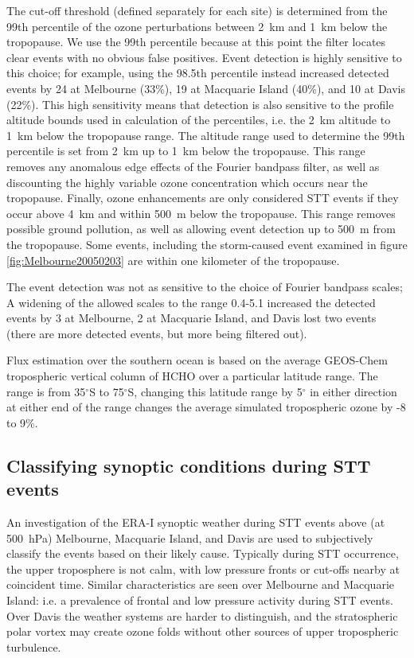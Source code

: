 \documentclass{article}
\begin{document}
    The cut-off threshold (defined separately for each site) is determined from the 99th percentile of the ozone perturbations between 2~km and 1~km below the tropopause.
    We use the 99th percentile because at this point the filter locates clear events with no obvious false positives.
    Event detection is highly sensitive to this choice; for example, using the 98.5th percentile instead increased detected events by 24 at Melbourne (33\%), 19 at Macquarie Island (40\%), and 10 at Davis (22\%).
    This high sensitivity means that detection is also sensitive to the profile altitude bounds used in calculation of the percentiles, i.e. the 2~km altitude to 1~km below the tropopause range.
    The altitude range used to determine the 99th percentile is set from 2~km up to 1~km below the tropopause.
    This range removes any anomalous edge effects of the Fourier bandpass filter, as well as discounting the highly variable ozone concentration which occurs near the tropopause.
    Finally, ozone enhancements are only considered STT events if they occur above 4~km and within 500~m below the tropopause.
    This range removes possible ground pollution, as well as allowing event detection up to 500~m from the tropopause.
    Some events, including the storm-caused event examined in figure \ref{fig:Melbourne20050203} are within one kilometer of the tropopause. 
    
    The event detection was not as sensitive to the choice of Fourier bandpass scales; A widening of the allowed scales to the range 0.4-5.1 increased the detected events by 3 at Melbourne, 2 at Macquarie Island, and Davis lost two events (there are more detected events, but more being filtered out).
    
    Flux estimation over the southern ocean is based on the average GEOS-Chem tropospheric vertical column of HCHO over a particular latitude range.
    The range is from 35$^{\circ}$S to 75$^{\circ}$S, changing this latitude range by 5$^{\circ}$ in either direction at either end of the range changes the average simulated tropospheric ozone by -8 to 9\%.

  \subsection{Classifying synoptic conditions during STT events}
  \label{Section:WeatherClassifications}
    An investigation of the ERA-I synoptic weather during STT events above (at 500~hPa) Melbourne, Macquarie Island, and Davis are used to subjectively classify the events based on their likely cause.
    Typically during STT occurrence, the upper troposphere is not calm, with low pressure fronts or cut-offs nearby at coincident time.
    Similar characteristics are seen over Melbourne and Macquarie Island: i.e. a prevalence of frontal and low pressure activity during STT events.
    Over Davis the weather systems are harder to distinguish, and the stratospheric polar vortex may create ozone folds without other sources of upper tropospheric turbulence.
\end{document}
